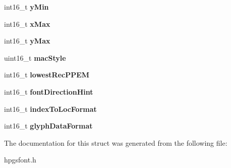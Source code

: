 \begin{DoxyCompactItemize}
\item 
int16\_\-t {\bfseries yMin}\label{structhpgs__font__head__data__st_ab1da9db9865b5d3b4d990319c43c3ba3}

\item 
int16\_\-t {\bfseries xMax}\label{structhpgs__font__head__data__st_a19dfd9176ebcf46cfbf6cbbaf1e7b0c0}

\item 
int16\_\-t {\bfseries yMax}\label{structhpgs__font__head__data__st_ac036c66f55e2d6a53196a353e870f40e}

\item 
uint16\_\-t {\bfseries macStyle}\label{structhpgs__font__head__data__st_a65909042dbb28571a8ff4fd2c40be14d}

\item 
int16\_\-t {\bfseries lowestRecPPEM}\label{structhpgs__font__head__data__st_adabb4e9c056b06beadf4de5f44aa1f21}

\item 
int16\_\-t {\bfseries fontDirectionHint}\label{structhpgs__font__head__data__st_adbdcafc28f35871a3208a78df1595450}

\item 
int16\_\-t {\bfseries indexToLocFormat}\label{structhpgs__font__head__data__st_ae55fc3da77a936b0619919dc51e46595}

\item 
int16\_\-t {\bfseries glyphDataFormat}\label{structhpgs__font__head__data__st_a2c3140a74cc2c384dd80aebd493d493f}

\end{DoxyCompactItemize}


The documentation for this struct was generated from the following file:\begin{DoxyCompactItemize}
\item 
hpgsfont.h\end{DoxyCompactItemize}
